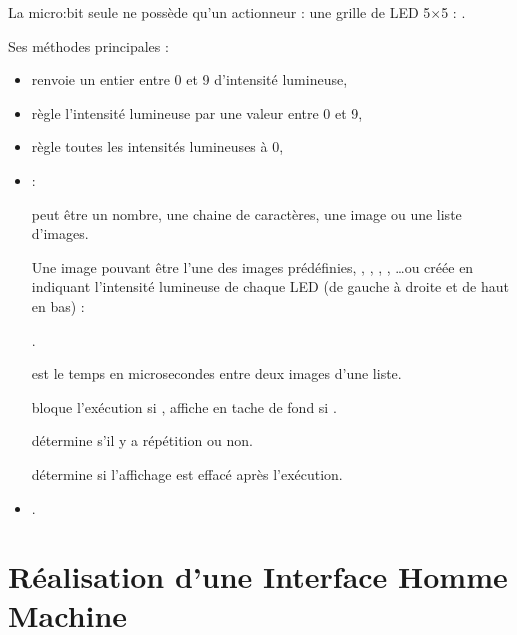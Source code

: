 
La micro\string:bit seule ne possède qu'un actionneur : une grille de LED 5$\times$5 : .

Ses méthodes principales :

\begin{itemize}
	\item {} renvoie un entier entre 0 et 9 d'intensité lumineuse,
	\item {} règle l'intensité lumineuse par une valeur entre 0 et 9,
	\item {} règle toutes les intensités lumineuses à 0,
	\item {} :
	 
	 peut être un nombre, une chaine  de caractères, une image ou une liste d'images.
	
	Une image pouvant être l'une des images prédéfinies, , , , ,  \ldots ou créée en indiquant l'intensité lumineuse de chaque LED (de gauche à droite et de haut en bas) :
	
    .
	
	 est le temps en microsecondes entre deux images d'une liste.
	
	 bloque l'exécution si , affiche en tache de fond si .
	
	 détermine s'il y a répétition ou non.
	
	 détermine si l'affichage est effacé après l'exécution. 
	\item {}.
	
\end{itemize}

\section{Réalisation d'une Interface Homme Machine}

